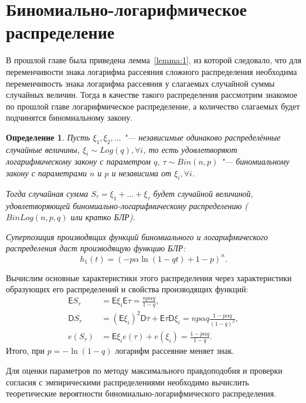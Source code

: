 \documentclass[12pt, specialist, subf, substylefile = spbu_report.rtx]{disser}
\newtheorem{define}{Определение}
\begin{document}
	\section{Биномиально-логарифмическое распределение}
	
	В прошлой главе была приведена лемма~\ref{lemma:1}, из которой следовало, что для переменчивости знака логарифма рассеяния сложного распределения необходима переменчивость знака логарифма рассеяния у слагаемых случайной суммы случайных величин. Тогда в качестве такого распределения рассмотрим знакомое по прошлой главе логарифмическое распределение, а количество слагаемых будет подчинятся биномиальному закону. 
	
	\begin{define}
		Пусть $\xi _1, \xi _2, \dots$ "--- независимые одинаково распределённые случайные величины, $\xi _i \sim Log(q), \forall i$, то есть удовлетворяют логарифмическому закону с параметром $q$, $\tau \sim Bin(n, p)$ "--- биномиальному закону с параметрами $n$ и $p$ и независима от $\xi _i, \forall i$.
		
		Тогда случайная сумма $S _\tau = \xi _1 + \dots + \xi _\tau$ будет случайной величиной, удовлетворяющей биномиально-логарифмическому распределению ($BinLog(n, p, q)$ или кратко \glqq БЛР\grqq).
		
		Суперпозиция производящих функций биномиального и логарифмического распределения даст производящую функцию БЛР:
		\begin{equation}\label{eq:BLR}
			h _1(t) = \left(-p \alpha \ln (1 - qt) + 1 - p\right) ^n.
		\end{equation}
		\label{def:BLR}
	\end{define}

	Вычислим основные характеристики этого распределения через характеристики образующих его распределений и свойства производящих функций:
	\[
		\begin{aligned}
			\mathsf{E} S _\tau &= \mathsf{E} \xi _i \mathsf{E} \tau = \frac {n p \alpha q} {1 - q},\\
			\mathsf{D} S _\tau &= \left( \mathsf{E} \xi _i \right) ^2 \mathsf{D} \tau + \mathsf{E} \tau \mathsf{D} \xi _i = n p \alpha q \frac {1 - p \alpha q} {(1 - q) ^2},\\
			e (S _\tau) &= \mathsf{E} \xi _i e (\tau) + e (\xi _i) = \frac {1 - p \alpha q} {1 - q}.
		\end{aligned}
	\]
	Итого, при $ p = - \ln (1 - q) $ логарифм рассеяние меняет знак.
	
	Для оценки параметров по методу максимального правдоподобия и проверки согласия с эмпирическими распределениями необходимо вычислить теоретические вероятности биномиально-логарифмического распределения.
	
\end{document}
